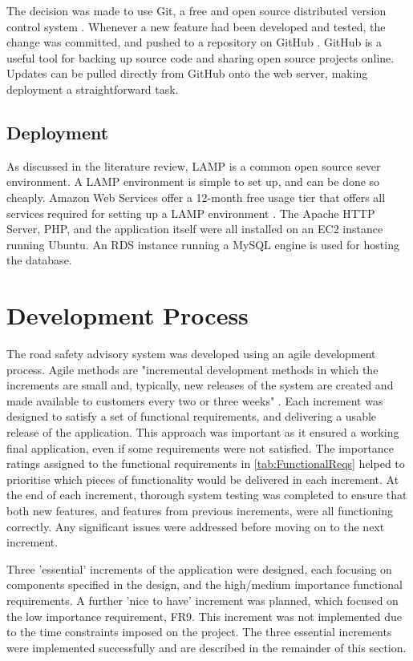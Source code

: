 \documentclass[authoryearcitations]{UoYCSproject}
\begin{document}
The decision was made to use Git, a free and open source distributed version control system \citep{Git}. Whenever a new feature had been developed and tested, the change was committed, and pushed to a repository on GitHub \citep{GitHub}. GitHub is a useful tool for backing up source code and sharing open source projects online. Updates can be pulled directly from GitHub onto the web server, making deployment a straightforward task.

\subsection{Deployment}

As discussed in the literature review, LAMP is a common open source sever environment. A LAMP environment is simple to set up, and can be done so cheaply. Amazon Web Services offer a 12-month free usage tier that offers all services required for setting up a LAMP environment \citep{AmazonWebServices}. The Apache HTTP Server, PHP, and the application itself were all installed on an EC2 instance running Ubuntu. An RDS instance running a MySQL engine is used for hosting the database.

\section{Development Process}

The road safety advisory system was developed using an agile development process. Agile methods are "incremental development methods in which the increments are small and, typically, new releases of the system are created and made available to customers every two or three weeks" \citep{Sommerville2005}. Each increment was designed to satisfy a set of functional requirements, and delivering a usable release of the application. This approach was important as it ensured a working final application, even if some requirements were not satisfied. The importance ratings assigned to the functional requirements in \autoref{tab:FunctionalReqs} helped to prioritise which pieces of functionality would be delivered in each increment. At the end of each increment, thorough system testing was completed to ensure that both new features, and features from previous increments, were all functioning correctly. Any significant issues were addressed before moving on to the next increment. 

Three 'essential' increments of the application were designed, each focusing on components specified in the design, and the high/medium importance functional requirements. A further 'nice to have' increment was planned, which focused on the low importance requirement, FR9. This increment was not implemented due to the time constraints imposed on the project. The three essential increments were implemented successfully and are described in the remainder of this section.
\end{document}
